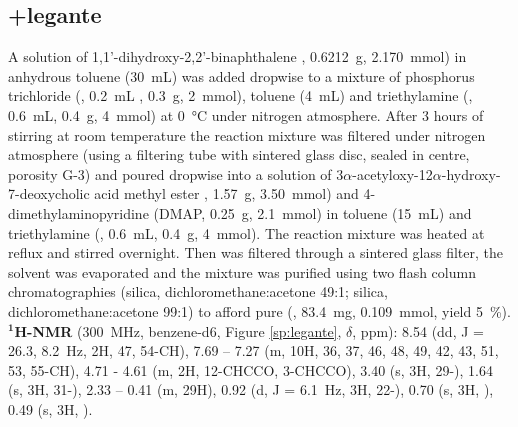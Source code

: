 \subsection{\legante{} \cmpd+{legante}}





A solution of 1,1'-di\-hydroxy-2,2'-bi\-naphthalene , 0.6212~g, 2.170~mmol) in anhydrous toluene (30~mL) was added dropwise to a mixture of phosphorus trichloride (, 0.2~mL%
, 0.3~g, 2~mmol), toluene (4~mL) and triethylamine (, 0.6~mL, 0.4~g, 4~mmol) at \SI{0}{\celsius} under nitrogen atmosphere. After 3 hours of stirring at room temperature the reaction mixture was filtered under nitrogen atmosphere (using a filtering tube with sintered glass disc, sealed in centre, porosity G-3) and poured dropwise 
into a solution of 3$\alpha$-acetyloxy-12$\alpha$-hydroxy-7-deoxy\-cholic acid methyl ester , 1.57~g, 3.50~mmol) and 4-dimethylaminopyridine (DMAP, 0.25~g, 2.1~mmol) in toluene (15~mL) and triethylamine (, 0.6~mL, 0.4~g, 4~mmol). The reaction mixture was heated at reflux %
and stirred overnight. Then was filtered through a sintered glass filter, the solvent was evaporated and the mixture was purified using two flash column chromatographies  
(silica, di\-chloro\-methane:acetone 49:1; silica, di\-chloro\-methane:acetone 99:1) to afford pure \legante{} %
 (, 83.4~mg, 0.109~mmol, yield 5~\%).
$\mathbf{^{1}}$\textbf{H-NMR} (300~MHz, benzene-d6, Figure \ref{sp:legante}, $\delta$, ppm):  8.54 (dd, J = 26.3, 8.2~Hz, 2H, 47, 54-CH), 7.69 – 7.27 (m, 10H, 36, 37, 46, 48, 49, 42, 43, 51, 53, 55-CH), 4.71 - 4.61 (m, 2H, 12-CHCCO, 3-CHCCO), 3.40 (s, 3H, 29-), 1.64 (s, 3H, 31-), 2.33 – 0.41 (m, 29H), 0.92 (d, J = 6.1~Hz, 3H, 22-), 0.70 (s, 3H, ), 0.49 (s, 3H, ).


